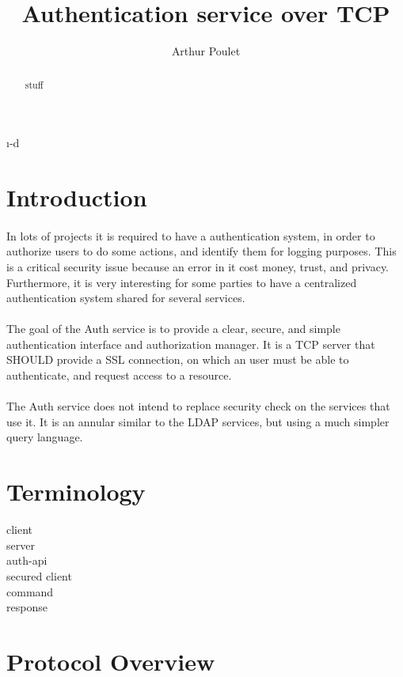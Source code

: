 \i-d
\title{Authentication service over TCP}
\author{Arthur Poulet}
\address{University of Kent}



\maketitle

\begin{abstract}
	stuff
\end{abstract}

\newpage
\tableofcontents

\newpage
\section{Introduction}
\paragraph{}
In lots of projects it is required to have a authentication system, in order to authorize users to do some actions, and identify them for logging purposes. This is a critical security issue because an error in it cost money, trust, and privacy. Furthermore, it is very interesting for some parties to have a centralized authentication system shared for several services.
\paragraph{}
The goal of the Auth service is to provide a clear, secure, and simple authentication interface and authorization manager. It is a TCP server that SHOULD provide a SSL connection, on which an user must be able to authenticate, and request access to a resource.
\paragraph{}
The Auth service does not intend to replace security check on the services that use it. It is an annular similar to the LDAP services, but using a much simpler query language.

\newpage
\section{Terminology}
\begin{description}
	\item[client]
	\item[server]
	\item[auth-api]
	\item[secured client]
	\item[command]
	\item[response]
\end{description}

\newpage
\section{Protocol Overview}
\paragraph{}


